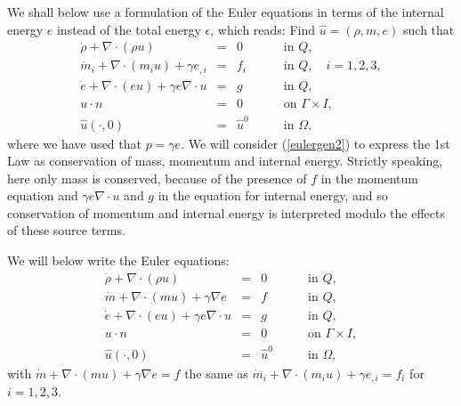 We shall below use a formulation of the Euler equations 
in terms of the internal energy $e$ instead of the total energy $\epsilon$,
which reads: Find $\hat u=(\rho ,m,e)$ such that 
\begin{equation}\label{eulergen2} 
\begin{array}{rcll} 
\dot\rho +\nabla\cdot (\rho u)&=& 0\quad &\mbox{in }Q,\\
\dot m_i+\nabla\cdot(m_iu)+ \gamma e_{,i} &=&  f_i \quad &\mbox{in } Q,
\quad i=1,2,3, \\ 
 
\dot e +\nabla\cdot (eu)+\gamma e\nabla\cdot u&=& g\quad &\mbox{in }Q,\\
  u\cdot n &=& 0   \qquad  &\mbox{on }  \Gamma\times I,\\                       
\hat u(\cdot ,0) &=&  \hat u^0\qquad &\mbox{in }  \Omega , 
\end{array} 
\end{equation}     
where we have used that $p=\gamma e$. We will consider (\ref{eulergen2})
to express the 1st Law as conservation of mass, momentum and internal
energy. Strictly speaking, here only mass is conserved,
because of the presence of $f$ in the momentum equation
and $\gamma e\nabla\cdot u$ and $g$ in the 
equation for internal energy, and so conservation of 
momentum and internal energy is interpreted modulo 
the effects of these source terms. 

We will below write the Euler equations: 
\begin{equation}\label{eulergen3} 
\begin{array}{rcll} 
\dot\rho +\nabla\cdot (\rho u)&=& 0\quad &\mbox{in }Q,\\
\dot m +\nabla\cdot(mu)+ \gamma \nabla e &=&  f \quad &\mbox{in } Q,\\ 
\dot e +\nabla\cdot (eu)+\gamma e\nabla\cdot u&=& g\quad &\mbox{in }Q,\\
  u\cdot n &=& 0   \qquad  &\mbox{on }  \Gamma\times I,\\                       
\hat u(\cdot ,0) &=&  \hat u^0\qquad &\mbox{in }  \Omega , 
\end{array} 
\end{equation}
with $\dot m+\nabla\cdot(mu)+ \gamma\nabla e =  f$ the same as      
$\dot m_i+\nabla\cdot(m_iu)+ \gamma e_{,i} =  f_i$ for 
$i =1,2,3$.






